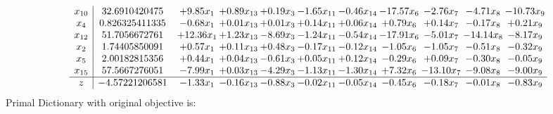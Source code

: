 \documentclass[9pt]{article}
\begin{document}
\[\begin{array}{c| c c@{\hskip 2pt} c@{\hskip 2pt} c@{\hskip 2pt} c@{\hskip 2pt} c@{\hskip 2pt} c@{\hskip 2pt} c@{\hskip 2pt} c@{\hskip 2pt} c@{\hskip 2pt} }
 x_{10}   &  32.6910420475 & +  9.85 x_{1} & +  0.89 x_{13} & +  0.19 x_{3} & -1.65 x_{11} & -0.46 x_{14} & -17.57 x_{6} & -2.76 x_{7} & -4.71 x_{8} & -10.73 x_{9}\\
 x_{4}   &  0.826325411335 & -0.68 x_{1} & +  0.01 x_{13} & +  0.01 x_{3} & +  0.14 x_{11} & +  0.06 x_{14} & +  0.79 x_{6} & +  0.14 x_{7} & -0.17 x_{8} & +  0.21 x_{9}\\
 x_{12}   &  51.7056672761 & + 12.36 x_{1} & +  1.23 x_{13} & -8.69 x_{3} & -1.24 x_{11} & -0.54 x_{14} & -17.91 x_{6} & -5.01 x_{7} & -14.14 x_{8} & -8.17 x_{9}\\
 x_{2}   &  1.74405850091 & +  0.57 x_{1} & +  0.11 x_{13} & +  0.48 x_{3} & -0.17 x_{11} & -0.12 x_{14} & -1.05 x_{6} & -1.05 x_{7} & -0.51 x_{8} & -0.32 x_{9}\\
 x_{5}   &  2.00182815356 & +  0.44 x_{1} & +  0.04 x_{13} & -0.61 x_{3} & +  0.05 x_{11} & +  0.12 x_{14} & -0.29 x_{6} & +  0.09 x_{7} & -0.30 x_{8} & -0.05 x_{9}\\
 x_{15}   &  57.5667276051 & -7.99 x_{1} & +  0.03 x_{13} & -4.29 x_{3} & -1.13 x_{11} & -1.30 x_{14} & +  7.32 x_{6} & -13.10 x_{7} & -9.08 x_{8} & -9.00 x_{9}\\
\hline
z    &  -4.57221206581 & -1.33 x_{1} & -0.16 x_{13} & -0.88 x_{3} & -0.02 x_{11} & -0.05 x_{14} & -0.45 x_{6} & -0.18 x_{7} & -0.01 x_{8} & -0.83 x_{9}\\
\end{array}\]
Primal Dictionary with original objective is:
\end{document}
